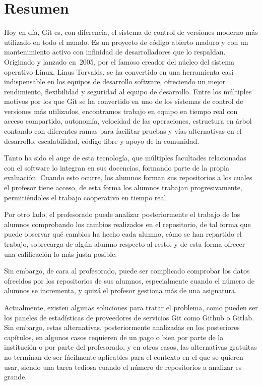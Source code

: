 \chapter*{Resumen\label{00summary}}


Hoy en día, Git\cite{EDteam,CodicesSoftware,Uqbar,Sivsa} es, con
diferencia, el sistema de control de versiones moderno más utilizado
en todo el mundo. Es un proyecto de código abierto maduro y con un
mantenimiento activo con infinidad de desarrolladores que lo
respaldan. Originado y lanzado en~2005, por el famoso creador del
núcleo del sistema operativo Linux, Linus Torvalds, se ha
convertido en una herramienta casi indispensable en los equipos de
desarrollo software, ofreciendo un mejor rendimiento, flexibilidad y
seguridad al equipo de desarrollo. Entre los múltiples motivos por los
que Git se ha convertido en uno de los sistemas de control de
versiones más utilizados, encontramos trabajo en equipo en tiempo real
con acceso compartido, autonomía, velocidad de las operaciones,
estructura en árbol contando con diferentes ramas para facilitar
pruebas y vías alternativas en el desarrollo, escalabilidad, código
libre y apoyo de la comunidad.

Tanto ha sido el auge de esta tecnología, que múltiples facultades
relacionadas con el software lo integran en sus docencias, formando
parte de la propia evaluación. Cuando esto ocurre, los alumnos forman
sus repositorios a los cuales el profesor tiene acceso, de esta forma
los alumnos trabajan progresivamente, permitiéndoles el trabajo
cooperativo en tiempo real.

Por otro lado, el profesorado puede analizar posteriormente el trabajo
de los alumnos comprobando los cambios realizados en el repositorio,
de tal forma que puede observar qué cambios ha hecho cada alumno, cómo
se han repartido el trabajo, sobrecarga de algún alumno respecto al
resto, y de esta forma ofrecer una calificación lo más justa posible.

Sin embargo, de cara al profesorado, puede ser complicado comprobar
los datos ofrecidos por los repositorios de sus alumnos, especialmente
cuando el número de alumnos se incrementa, y quizá el profesor
gestiona más de una asignatura.

Actualmente, existen algunas soluciones para tratar el problema,
como pueden ser los paneles de estadísticas de proveedores de
servicios Git como Github o Gitlab. Sin embargo, estas alternativas,
posteriormente analizadas en los posteriores capítulos, en algunos
casos requieren de un pago o bien por parte de la institución o por
parte del profesorado, y en otros casos, las alternativas gratuitas no
terminan de ser fácilmente aplicables para el contexto en el que se
quieren usar, siendo una tarea tediosa cuando el número de
repositorios a analizar es grande.

